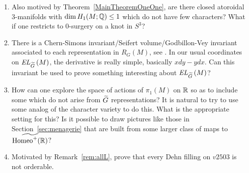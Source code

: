 \documentclass[tikz, sepfignums, defaultenums]{nmd/article}
\newcommand{\RG}[1]{\mathit{R}_{G}\left(#1\right)}
\newcommand{\TEL}[1]{\mathit{EL}_\Gtil\left(#1\right)}
\begin{document}
\begin{enumerate}[label={(\arabic*)}]
\item Also motived by Theorem~\ref{MainTheoremOneOne}, are there
  closed atoroidal 3-manifolds with $\dim H_1(M; {\mathbb Q}) \leq 1$ which do
  not have few characters?  What if one restricts to $0$-surgery on a
  knot in $S^3$?  

\item There is a Chern-Simons invariant/Seifert volume/Godbillon-Vey
  invariant associated to each representation in $\RG{M}$, see
  \cite{Khoi2003}.  In our usual coordinates on $\TEL{M}$, the
  derivative is really simple, basically
  $x \mathit{dy} - y \mathit{dx}$.  Can this invariant be used to prove
  something interesting about $\TEL{M}$?

\item How can one explore the space of actions of $\pi_1(M)$ on ${\mathbb R}$
  so as to include some which do not arise from $\Gtil$
  representations?  It is natural to try to use some analog of the
  character variety to do this.  What is the appropriate setting for
  this?  Is it possible to draw pictures like those in
  Section~\ref{sec:menagerie} that are built from some larger class of
  maps to $\widetilde{\operatorname{Homeo}^+({\mathbb R})}$?

\item Motivated by Remark~\ref{rem:allL}, prove that every Dehn
  filling on $v2503$ is not orderable.

\end{enumerate}









{\RaggedRight 
  \small
  
   }
\end{document}
